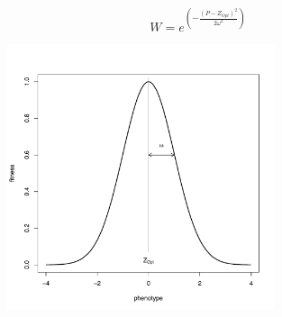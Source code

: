 \documentclass[letterpaper,12pt,oneside]{book}
\begin{document}
\[W = e^{\left(-\frac{\left(P-Z_{Opt}\right)^2}{2\omega^{2}}\right)} \]

\begin{figure}[h]
	\centering
		\includegraphics[width=0.70\textwidth]{stabilizing-selection.pdf}
	\label{fig:stabilizing-selection}
\end{figure}
\end{document}
